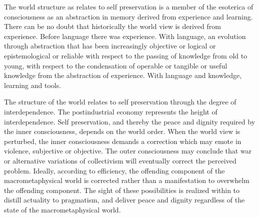 

The world structure as relates to self preservation is a member of the esoterica of consciousness as an abstraction in memory derived from experience and learning.  There can be no doubt that historically the  world view is derived from experience.  Before language there was experience.  With language, an evolution through abstraction that has been increasingly objective or logical or epistemological or reliable with respect to the passing of knowledge from old to young, with respect to the condensation of operable or tangible or useful knowledge from the abstraction of experience.  With language and knowledge, learning and tools.


The structure of the world relates to self preservation through the degree of interdependence.  The postindustrial economy represents the height of interdependence.  Self preservation, and thereby the peace and dignity required by the inner consciousness, depends on the world order.  When the world view is perturbed, the inner consciousness demands a correction which may emote in violence, subjective or objective.  The outer consciousness may conclude that war or alternative variations of collectivism will eventually correct the perceived problem.  Ideally, according to efficiency, the offending component of the macrometaphysical world is corrected rather than a manifestation to overwhelm the offending component.  The sight of these possibilities is realized within to distill actuality to pragmatism, and deliver peace and dignity regardless of the state of the macrometaphysical world.

\bye
